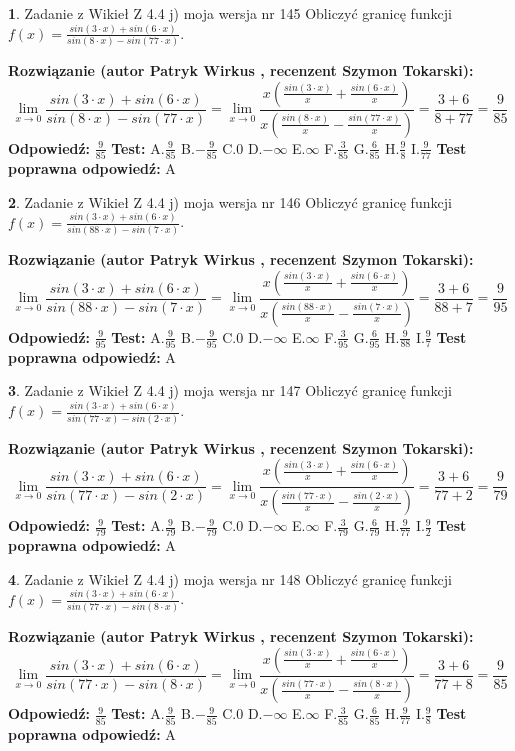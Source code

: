 \documentclass[12pt, a4paper]{article}
\theoremstyle{definition} %
\newtheorem{zad}{}
\newcommand{\zadStart}[1]{\begin{zad}#1\newline}
\newcommand{\zadStop}{\end{zad}}
\newcommand{\rozwStart}[2]{\noindent \textbf{Rozwiązanie (autor #1 , recenzent #2): }\newline}
\newcommand{\rozwStop}{\newline}
\newcommand{\odpStart}{\noindent \textbf{Odpowiedź:}\newline}
\newcommand{\odpStop}{\newline}
\newcommand{\testStart}{\noindent \textbf{Test:}\newline}
\newcommand{\testStop}{\newline}
\newcommand{\kluczStart}{\noindent \textbf{Test poprawna odpowiedź:}\newline}
\newcommand{\kluczStop}{\newline}
\begin{document}
\zadStart{Zadanie z Wikieł Z 4.4 j) moja wersja nr 145}
Obliczyć granicę funkcji $f(x)=\frac{sin(3\cdot x) +sin(6\cdot x)}{sin(8\cdot x) -sin(77\cdot x)}$.
\zadStop
\rozwStart{Patryk Wirkus}{Szymon Tokarski}
$$\lim\limits_{x\to 0}\frac{sin(3\cdot x) +sin(6\cdot x)}{sin(8\cdot x) -sin(77\cdot x)}=\lim\limits_{x\to 0}\frac{x(\frac{sin(3\cdot x)}{x}+\frac{sin(6\cdot x)}{x})}{x(\frac{sin(8\cdot x)}{x}-\frac{sin(77\cdot x)}{x})}=\frac{3+6}{8+77} = \frac{9}{85}$$
\rozwStop
\odpStart
$\frac{9}{85}$
\odpStop
\testStart
A.$\frac{9}{85}$
B.$-\frac{9}{85}$
C.$0$
D.$-\infty$
E.$\infty$
F.$\frac{3}{85}$
G.$\frac{6}{85}$
H.$\frac{9}{8}$
I.$\frac{9}{77}$
\testStop
\kluczStart
A
\kluczStop



\zadStart{Zadanie z Wikieł Z 4.4 j) moja wersja nr 146}
Obliczyć granicę funkcji $f(x)=\frac{sin(3\cdot x) +sin(6\cdot x)}{sin(88\cdot x) -sin(7\cdot x)}$.
\zadStop
\rozwStart{Patryk Wirkus}{Szymon Tokarski}
$$\lim\limits_{x\to 0}\frac{sin(3\cdot x) +sin(6\cdot x)}{sin(88\cdot x) -sin(7\cdot x)}=\lim\limits_{x\to 0}\frac{x(\frac{sin(3\cdot x)}{x}+\frac{sin(6\cdot x)}{x})}{x(\frac{sin(88\cdot x)}{x}-\frac{sin(7\cdot x)}{x})}=\frac{3+6}{88+7} = \frac{9}{95}$$
\rozwStop
\odpStart
$\frac{9}{95}$
\odpStop
\testStart
A.$\frac{9}{95}$
B.$-\frac{9}{95}$
C.$0$
D.$-\infty$
E.$\infty$
F.$\frac{3}{95}$
G.$\frac{6}{95}$
H.$\frac{9}{88}$
I.$\frac{9}{7}$
\testStop
\kluczStart
A
\kluczStop



\zadStart{Zadanie z Wikieł Z 4.4 j) moja wersja nr 147}
Obliczyć granicę funkcji $f(x)=\frac{sin(3\cdot x) +sin(6\cdot x)}{sin(77\cdot x) -sin(2\cdot x)}$.
\zadStop
\rozwStart{Patryk Wirkus}{Szymon Tokarski}
$$\lim\limits_{x\to 0}\frac{sin(3\cdot x) +sin(6\cdot x)}{sin(77\cdot x) -sin(2\cdot x)}=\lim\limits_{x\to 0}\frac{x(\frac{sin(3\cdot x)}{x}+\frac{sin(6\cdot x)}{x})}{x(\frac{sin(77\cdot x)}{x}-\frac{sin(2\cdot x)}{x})}=\frac{3+6}{77+2} = \frac{9}{79}$$
\rozwStop
\odpStart
$\frac{9}{79}$
\odpStop
\testStart
A.$\frac{9}{79}$
B.$-\frac{9}{79}$
C.$0$
D.$-\infty$
E.$\infty$
F.$\frac{3}{79}$
G.$\frac{6}{79}$
H.$\frac{9}{77}$
I.$\frac{9}{2}$
\testStop
\kluczStart
A
\kluczStop



\zadStart{Zadanie z Wikieł Z 4.4 j) moja wersja nr 148}
Obliczyć granicę funkcji $f(x)=\frac{sin(3\cdot x) +sin(6\cdot x)}{sin(77\cdot x) -sin(8\cdot x)}$.
\zadStop
\rozwStart{Patryk Wirkus}{Szymon Tokarski}
$$\lim\limits_{x\to 0}\frac{sin(3\cdot x) +sin(6\cdot x)}{sin(77\cdot x) -sin(8\cdot x)}=\lim\limits_{x\to 0}\frac{x(\frac{sin(3\cdot x)}{x}+\frac{sin(6\cdot x)}{x})}{x(\frac{sin(77\cdot x)}{x}-\frac{sin(8\cdot x)}{x})}=\frac{3+6}{77+8} = \frac{9}{85}$$
\rozwStop
\odpStart
$\frac{9}{85}$
\odpStop
\testStart
A.$\frac{9}{85}$
B.$-\frac{9}{85}$
C.$0$
D.$-\infty$
E.$\infty$
F.$\frac{3}{85}$
G.$\frac{6}{85}$
H.$\frac{9}{77}$
I.$\frac{9}{8}$
\testStop
\kluczStart
A
\kluczStop
\end{document}
